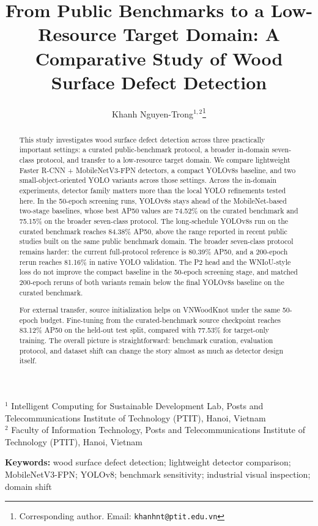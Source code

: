 \documentclass[10pt,a4paper]{article}
\title{From Public Benchmarks to a Low-Resource Target Domain: A Comparative Study of Wood Surface Defect Detection}
\author{
  Khanh Nguyen-Trong$^{1,2}$\thanks{Corresponding author. Email: \texttt{khanhnt@ptit.edu.vn}}
}
\date{}
\begin{document}
\maketitle

\begin{center}
\small
$^{1}$ Intelligent Computing for Sustainable Development Lab, Posts and Telecommunications Institute of Technology (PTIT), Hanoi, Vietnam \\
$^{2}$ Faculty of Information Technology, Posts and Telecommunications Institute of Technology (PTIT), Hanoi, Vietnam
\end{center}

\begin{abstract}
This study investigates wood surface defect detection across three practically important settings: a curated public-benchmark protocol, a broader in-domain seven-class protocol, and transfer to a low-resource target domain. We compare lightweight Faster R-CNN + MobileNetV3-FPN detectors, a compact YOLOv8s baseline, and two small-object-oriented YOLO variants across those settings. Across the in-domain experiments, detector family matters more than the local YOLO refinements tested here. In the 50-epoch screening runs, YOLOv8s stays ahead of the MobileNet-based two-stage baselines, whose best AP50 values are 74.52\% on the curated benchmark and 75.15\% on the broader seven-class protocol. The long-schedule YOLOv8s run on the curated benchmark reaches 84.38\% AP50, above the range reported in recent public studies built on the same public benchmark domain. The broader seven-class protocol remains harder: the current full-protocol reference is 80.39\% AP50, and a 200-epoch rerun reaches 81.16\% in native YOLO validation. The P2 head and the WNIoU-style loss do not improve the compact baseline in the 50-epoch screening stage, and matched 200-epoch reruns of both variants remain below the final YOLOv8s baseline on the curated benchmark.

For external transfer, source initialization helps on VNWoodKnot under the same 50-epoch budget. Fine-tuning from the curated-benchmark source checkpoint reaches 83.12\% AP50 on the held-out test split, compared with 77.53\% for target-only training. The overall picture is straightforward: benchmark curation, evaluation protocol, and dataset shift can change the story almost as much as detector design itself.
\end{abstract}

\noindent\textbf{Keywords:} wood surface defect detection; lightweight detector comparison; MobileNetV3-FPN; YOLOv8; benchmark sensitivity; industrial visual inspection; domain shift
\end{document}
